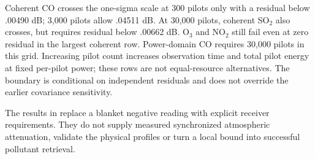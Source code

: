 \documentclass[conference]{IEEEtran}
\begin{document}
Coherent CO crosses the one-sigma scale at 300 pilots only with a residual below .00490 dB; 3,000 pilots allow .04511 dB. At 30,000 pilots, coherent SO$_2$ also crosses, but requires residual below .00662 dB. O$_3$ and NO$_2$ still fail even at zero residual in the largest coherent row. Power-domain CO requires 30,000 pilots in this grid. Increasing pilot count increases observation time and total pilot energy at fixed per-pilot power; these rows are not equal-resource alternatives. The boundary is conditional on independent residuals and does not override the earlier covariance sensitivity.

The results in  replace a blanket negative reading with explicit receiver requirements. They do not supply measured synchronized atmospheric attenuation, validate the physical profiles or turn a local bound into successful pollutant retrieval.
\end{document}
